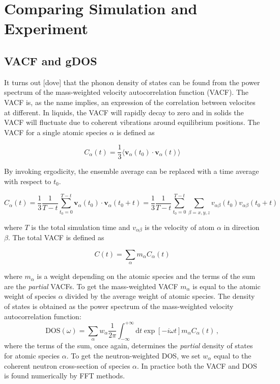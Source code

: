 \section{Comparing Simulation and Experiment}

\subsection{VACF and gDOS}
It turns out [dove] that the phonon density of states can be found from the power spectrum of the mass-weighted velocity autocorrelation function (VACF). The VACF is, as the name implies, an expression of the correlation between velocites at different. In liquids, the VACF will rapidly decay to zero and in solids the VACF will fluctuate due to coherent vibrations around equilibrium positions. The VACF for a single atomic species $\alpha$ is defined as

\[ C_\alpha(t) = \frac{1}{3} \langle \bm{v}_\alpha(t_0) \cdot \bm{v}_\alpha(t) \rangle \]

\noindent By invoking ergodicity, the ensemble average can be replaced with a time average with respect to $t_0$.

\[ C_\alpha(t) = \frac{1}{3} \frac{1}{T-t} \sum_{t_0=0}^{T-t} \bm{v}_\alpha(t_0) \cdot \bm{v}_\alpha(t_0 + t) = \frac{1}{3} \frac{1}{T-t} \sum_{t_0=0}^{T-t} \sum_{\beta=x,y,z} v_{\alpha\beta}(t_0) v_{\alpha\beta}(t_0 + t) \]

\noindent where $T$ is the total simulation time and $v_{\alpha\beta}$ is the velocity of atom $\alpha$ in direction $\beta$. The total VACF is defined as

\[ C(t) = \sum_\alpha m_\alpha C_\alpha(t) \]

\noindent where $m_\alpha$ is a weight depending on the atomic species and the terms of the sum are the \emph{partial} VACFs. To get the mass-weighted VACF $m_\alpha$ is equal to the atomic weight of species $\alpha$ divided by the average weight of atomic species. The density of states is obtained as the power spectrum of the mass-weighted velocity autocorrelation function:
%
\[ \text{DOS}(\omega) = \sum_\alpha w_\alpha \frac{1}{2\pi} \int^{+\infty}_{-\infty} \mathrm{d}t \exp[-i\omega t] m_\alpha C_\alpha(t) \, , \]
%
where the terms of the sum, once again, determines the \emph{partial} density of states for atomic species $\alpha$. To get the neutron-weighted DOS, we set $w_\alpha$ equal to the coherent neutron cross-section of species $\alpha$. In practice both the VACF and DOS is found numerically by FFT methods.

